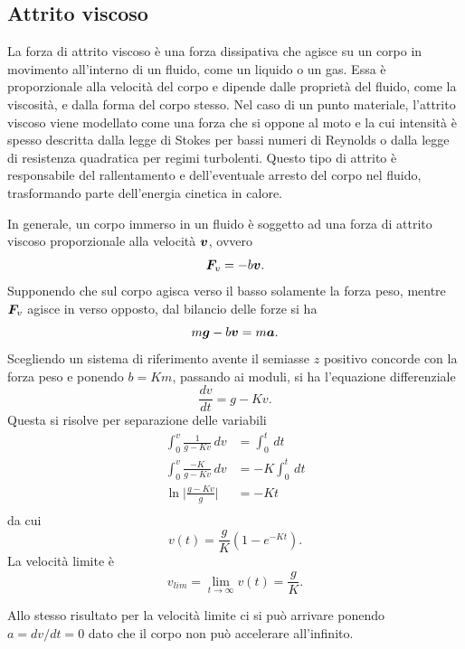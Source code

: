 \subsection{Attrito viscoso}
La forza di attrito viscoso è una forza dissipativa che agisce su un corpo in movimento all'interno di un fluido, come un liquido o un gas. Essa è proporzionale alla velocità del corpo e dipende dalle proprietà del fluido, come la viscosità, e dalla forma del corpo stesso. Nel caso di un punto materiale, l'attrito viscoso viene modellato come una forza che si oppone al moto e la cui intensità è spesso descritta dalla legge di Stokes per bassi numeri di Reynolds o dalla legge di resistenza quadratica per regimi turbolenti. Questo tipo di attrito è responsabile del rallentamento e dell'eventuale arresto del corpo nel fluido, trasformando parte dell'energia cinetica in calore.

In generale, un corpo immerso in un fluido è soggetto ad una forza di attrito viscoso proporzionale alla velocità $\bm{v}$, ovvero
\begin{equation}
    \bm{F}_v=-b\bm{v}.
\end{equation}
Supponendo che sul corpo agisca verso il basso solamente la forza peso, mentre $\bm{F}_v$ agisce in verso opposto, dal bilancio delle forze si ha
\begin{equation}
    m\bm{g}-b\bm{v}=m\bm{a}.
\end{equation}
Scegliendo un sistema di riferimento avente il semiasse $z$ positivo concorde con la forza peso e ponendo $b=Km$, passando ai moduli, si ha l'equazione differenziale
\begin{equation}
    \frac{dv}{dt}=g-Kv.
\end{equation}
Questa si risolve per separazione delle variabili
\begin{equation}
    \begin{split}
        \int_0^v\frac{1}{g-Kv}\,dv&=\int_0^t\,dt \\
        \int_0^v\frac{-K}{g-Kv}\,dv&=-K\int_0^t\,dt \\
        \ln{\bigg|\frac{g-Kv}{g}\bigg|}&=-Kt \\
    \end{split}
\end{equation}
da cui
\begin{equation}
    v(t)=\frac{g}{K}(1-e^{-Kt}).
\end{equation}
La velocità limite è
\begin{equation}
    v_{lim}=\lim_{t\to\infty}v(t)=\frac{g}{K}.
\end{equation}
\begin{obs}
    Allo stesso risultato per la velocità limite ci si può arrivare ponendo $a=dv/dt=0$ dato che il corpo non può accelerare all'infinito.
\end{obs}

